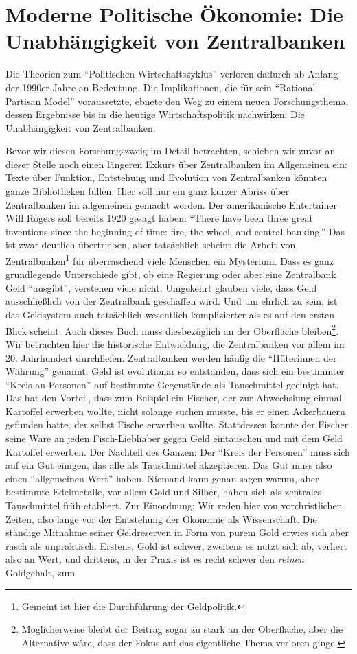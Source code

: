 \section{Moderne Politische Ökonomie: Die Unabhängigkeit von Zentralbanken}

Die Theorien zum "`Politischen Wirtschaftszyklus"' verloren dadurch ab Anfang der 1990er-Jahre an Bedeutung. Die Implikationen, die \textcite{Alesina1987} für sein "`Rational Partisan Model"' voraussetzte, ebnete den Weg zu einem neuen Forschungsthema, dessen Ergebnisse bis in die heutige Wirtschaftspolitik nachwirken: Die Unabhängigkeit von Zentralbanken.

Bevor wir diesen Forschungszweig im Detail betrachten, schieben wir zuvor an dieser Stelle noch einen längeren Exkurs über Zentralbanken im Allgemeinen ein: Texte über Funktion, Entstehung und Evolution von Zentralbanken könnten ganze Bibliotheken füllen. Hier soll nur ein ganz kurzer Abriss über Zentralbanken im allgemeinen gemacht werden. Der amerikanische Entertainer Will Rogers soll bereits 1920 gesagt haben: "`There have been three great inventions since the beginning of time: fire, the wheel, and central banking."' Das ist zwar deutlich übertrieben, aber tatsächlich scheint die Arbeit von Zentralbanken\footnote{Gemeint ist hier die Durchführung der Geldpolitik.} für überraschend viele Menschen ein Mysterium. Dass es ganz grundlegende Unterschiede gibt, ob eine Regierung oder aber eine Zentralbank Geld "`ausgibt"', verstehen viele nicht. Umgekehrt glauben viele, dass Geld ausschließlich von der Zentralbank geschaffen wird. Und um ehrlich zu sein, ist das Geldsystem auch tatsächlich wesentlich komplizierter als es auf den ersten Blick scheint. Auch dieses Buch muss diesbezüglich an der Oberfläche bleiben\footnote{Möglicherweise bleibt der Beitrag sogar zu stark an der Oberfläche, aber die Alternative wäre, dass der Fokus auf das eigentliche Thema verloren ginge.}. Wir betrachten hier die historische Entwicklung, die Zentralbanken vor allem im 20. Jahrhundert durchliefen. Zentralbanken werden häufig die "`Hüterinnen der Währung"' genannt. Geld ist evolutionär so entstanden, dass sich ein bestimmter "`Kreis an Personen"' auf bestimmte Gegenstände als Tauschmittel geeinigt hat. Das hat den Vorteil, dass zum Beispiel ein Fischer, der zur Abwechslung einmal Kartoffel erwerben wollte, nicht solange suchen musste, bis er einen Ackerbauern gefunden hatte, der selbst Fische erwerben wollte. Stattdessen konnte der Fischer seine Ware an jeden Fisch-Liebhaber gegen Geld eintauschen und mit dem Geld Kartoffel erwerben. Der Nachteil des Ganzen: Der "`Kreis der Personen"' muss sich auf ein Gut einigen, das alle als Tauschmittel akzeptieren. Das Gut muss also einen "`allgemeinen Wert"' haben. Niemand kann genau sagen warum, aber bestimmte Edelmetalle, vor allem Gold und Silber, haben sich als zentrales Tauschmittel früh etabliert. Zur Einordnung: Wir reden hier von vorchristlichen Zeiten, also lange vor der Entstehung der Ökonomie als Wissenschaft. Die ständige Mitnahme seiner Geldreserven in Form von purem Gold erwies sich aber rasch als unpraktisch. Erstens, Gold ist schwer, zweitens es nutzt sich ab, verliert also an Wert, und drittens, in der Praxis ist es recht schwer den \textit{reinen} Goldgehalt, zum 